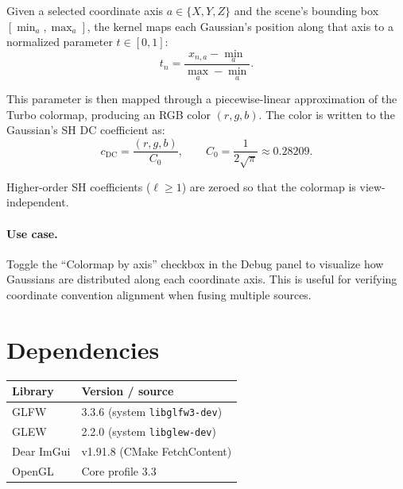 \documentclass[11pt]{article}
\begin{document}
Given a selected coordinate axis $a \in \{X, Y, Z\}$ and the scene's
bounding box $[\min_a, \max_a]$, the kernel maps each Gaussian's position
along that axis to a normalized parameter $t \in [0, 1]$:
\begin{equation}
  t_n = \frac{x_{n,a} - \min_a}{\max_a - \min_a}.
\end{equation}

This parameter is then mapped through a piecewise-linear approximation
of the Turbo colormap, producing an RGB color $(r, g, b)$. The color is
written to the Gaussian's SH DC coefficient as:
\begin{equation}
  c_{\text{DC}} = \frac{(r, g, b)}{C_0},
  \qquad
  C_0 = \frac{1}{2\sqrt{\pi}} \approx 0.28209.
\end{equation}

Higher-order SH coefficients ($\ell \geq 1$) are zeroed so that the
colormap is view-independent.

\paragraph{Use case.} Toggle the ``Colormap by axis'' checkbox in the
Debug panel to visualize how Gaussians are distributed along each
coordinate axis. This is useful for verifying coordinate convention
alignment when fusing multiple sources.

\section{Dependencies}

\begin{center}
\begin{tabular}{ll}
  \textbf{Library} & \textbf{Version / source} \\
  \hline
  GLFW & 3.3.6 (system \texttt{libglfw3-dev}) \\
  GLEW & 2.2.0 (system \texttt{libglew-dev}) \\
  Dear ImGui & v1.91.8 (CMake FetchContent) \\
  OpenGL & Core profile 3.3 \\
\end{tabular}
\end{center}
\end{document}
